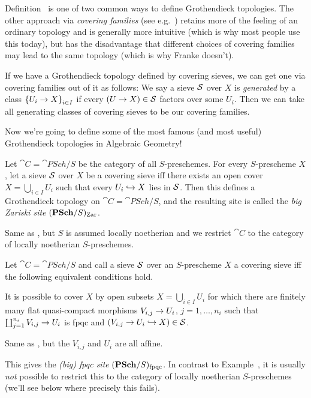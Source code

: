 \documentclass[a4paper,parskip=half,numbers=enddot, DIV=12]{scrreprt}
\begin{document}
\begin{rem}
	Definition~ is one of two common ways to define Grothendieck topologies. The other approach via \emph{covering families} (see e.g.\ \cite[]{stacks-project}) retains more of the feeling of an ordinary topology and is generally more intuitive (which is why most people use this today), but has the disadvantage that different choices of covering families may lead to the same topology (which is why Franke doesn't).
	
	If we have a Grothendieck topology defined by covering sieves, we can get one via covering families out of it as follows: We say a sieve $\mathcal{S}$ over $X$ is \emph{generated} by a class $\left\{U_i\morphism X\right\}_{i\in I}$ if every $(U\morphism X)\in \Ss$ factors over some $U_i$. Then we can take all generating classes of covering sieves to be our covering families.
\end{rem}
Now we're going to define some of the most famous (and most useful) Grothendieck topologies in Algebraic Geometry!
\begin{example}
	\begin{alphanumerate}
		\item {}Let $\cat C=\cat{PSch}/S$ be the category of all $S$-preschemes. For every $S$-prescheme $X$, let a sieve $\mathcal{S}$ over $X$ be a covering sieve iff there exists an open cover $X=\bigcup_{i\in I}U_i$ such that every $U_i\monomorphism X$ lies in $\mathcal{S}$. Then this defines a Grothendieck topology on $\cat C=\cat{PSch}/S$, and the resulting site is called the \emph{big Zariski site} $(\cat{PSch}/S)_\Zar$.
		\item Same as , but $S$ is assumed locally noetherian and we restrict $\cat C$ to the category of locally noetherian $S$-preschemes.
	\end{alphanumerate}
\end{example}
\begin{example}
	Let $\cat C=\cat{PSch}/S$ and call a sieve $\mathcal{S}$ over an $S$-prescheme $X$ a covering sieve iff the following equivalent conditions hold.
	\begin{alphanumerate}
		\item It is possible to cover $X$ by open subsets $X=\bigcup_{i\in I}U_i$ for which there are finitely many flat quasi-compact morphisms $V_{i,j}\morphism U_i$, $j=1,\ldots,n_i$ such that $\coprod_{j=1}^{n_i}V_{i,j}\morphism U_i$ is fpqc and $(V_{i,j}\morphism U_i\monomorphism X)\in\Ss$.
		\item Same as , but the $V_{i,j}$ and $U_i$ are all affine.
	\end{alphanumerate}
	This gives the \emph{(big) fpqc site} $(\cat{PSch}/S)_\fpqc$. In contrast to Example~, it is usually \emph{not} possible to restrict this to the category of locally noetherian $S$-preschemes (we'll see below where precisely this fails).
\end{example}
\end{document}
